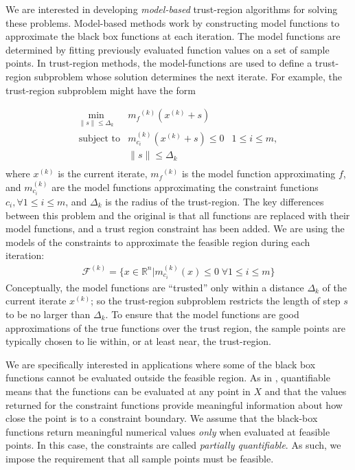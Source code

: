 \documentclass{article}
\theoremstyle{case}
\numberwithin{theorem}{subsection}
\newcommand{\dk}{\Delta_k}
\newcommand{\feasiblek}{{\mathcal F^{(k)}}}
\newcommand{\mcik}{{{m}^{(k)}_{c_i}}}
\newcommand{\mfk}{{{m}_f}^{(k)}}
\newcommand{\Rn}{\mathbb R^n}
\newcommand{\xk}{{x^{(k)}}}
\begin{document}
We are interested in developing {\em model-based} trust-region algorithms for solving these problems.
Model-based methods work by constructing model functions to approximate the black box functions at each iteration.
The model functions are determined by fitting previously evaluated function values on a set of sample points.
In trust-region methods, the model-functions are used to define a trust-region subproblem whose solution determines the next iterate.
For example, the trust-region subproblem might have the form

\[ \begin{array}{ccl} \min_{\|s\| \le \dk}
 & \mfk (\xk+s) \\
\mbox{subject to} & \mcik(\xk + s) \le 0 & 1 \le i \le m, \\
& \|s\| \le \dk \\
\end{array}
\]
where $\xk$ is the current iterate, $\mfk$ is the model function approximating $f$, 
and $\mcik$ are the model functions approximating the constraint functions $c_i, \forall 1 \le i \le m$, and $\dk$ is the radius of the trust-region.
The key differences between this problem and the original is that all functions are replaced with their model functions, and a trust region constraint has been added.
We are using the models of the constraints to approximate the feasible region during each iteration:
\begin{align}
\feasiblek = \{x \in \Rn | \mcik(x) \le 0 \; \forall 1 \le i \le m \} \label{define_feasiblek}
\end{align}
Conceptually, the model functions are ``trusted'' only within a distance $ \dk $ of the current iterate $\xk$; so the trust-region subproblem restricts the length of step $s$ to be no larger than $\dk$.
To ensure that the model functions are good approximations of the true functions over the trust region, the sample points are typically chosen to lie within, or at least near, the trust-region.


We are specifically interested in applications where some of the black box functions cannot be evaluated outside the feasible region.
As in \cite{digabel2015taxonomy}, quantifiable means that the functions can be evaluated at any point in $X$ and that the values returned for the constraint functions provide meaningful information about how close the point is to a constraint boundary.
We assume that the black-box functions return meaningful numerical values \emph{only} when evaluated at feasible points.
In this case, the constraints are called {\em partially quantifiable}.   
As such, we impose the requirement that all sample points must be feasible.
\end{document}
